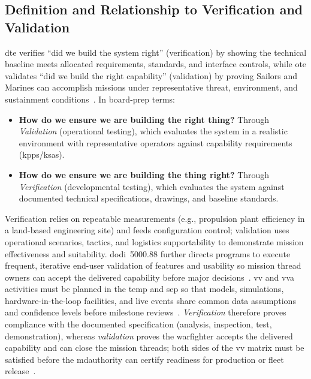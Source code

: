 \documentclass[../main.tex]{subfiles}
\begin{document}
\subsection{Definition and Relationship to Verification and Validation}
\ac{dte} verifies ``did we build the system right'' (verification) by showing the technical baseline meets allocated requirements, standards, and interface controls, while \ac{ote} validates ``did we build the right capability'' (validation) by proving Sailors and Marines can accomplish missions under representative threat, environment, and sustainment conditions~\autocite{DoDI5000-02}. In board-prep terms:
\begin{itemize}
  \item \textbf{How do we ensure we are building the right thing?} Through \textit{Validation} (operational testing), which evaluates the system in a realistic environment with representative operators against capability requirements (\acp{kpp}/\acp{ksa}).
  \item \textbf{How do we ensure we are building the thing right?} Through \textit{Verification} (developmental testing), which evaluates the system against documented technical specifications, drawings, and baseline standards.
\end{itemize}
Verification relies on repeatable measurements (e.g., propulsion plant efficiency in a land-based engineering site) and feeds configuration control; validation uses operational scenarios, tactics, and logistics supportability to demonstrate mission effectiveness and suitability. \ac{dodi}~5000.88 further directs programs to execute frequent, iterative end-user validation of features and usability so mission thread owners can accept the delivered capability before major decisions~\autocite{DoDI5000-88}. \ac{vv} and \ac{vva} activities must be planned in the \ac{temp} and \ac{sep} so that models, simulations, hardware-in-the-loop facilities, and live events share common data assumptions and confidence levels before milestone reviews~\autocite{DoDI5000-89}.
\textit{Verification} therefore proves compliance with the documented specification (analysis, inspection, test, demonstration), whereas \textit{validation} proves the warfighter accepts the delivered capability and can close the mission threads; both sides of the \ac{vv} matrix must be satisfied before the \ac{mdauthority} can certify readiness for production or fleet release~\autocite{DoDI5000-89}.
\end{document}
